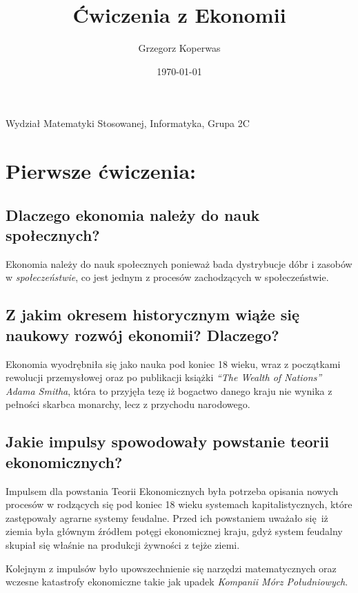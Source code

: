 \documentclass[a4paper,12pt]{article}
\title{Ćwiczenia z Ekonomii}
\author{Grzegorz Koperwas}
\date{\today}
\let\oldsection\section
\renewcommand\section{\clearpage\oldsection}
\begin{document}
\begin{titlepage}
	\maketitle
	\begin{center}
		Wydział Matematyki Stosowanej, Informatyka, Grupa 2C
	\end{center}
	\thispagestyle{empty}
\end{titlepage}
\setcounter{tocdepth}{1}
\tableofcontents
\pagebreak
\section{Pierwsze ćwiczenia:}


\subsection{Dlaczego ekonomia należy do nauk społecznych?}

Ekonomia należy do nauk społecznych ponieważ bada dystrybucje dóbr i zasobów w
\emph{społeczeństwie}, co jest jednym z procesów zachodzących w społeczeństwie.

\subsection{Z jakim okresem historycznym wiąże się naukowy rozwój ekonomii? Dlaczego?}

Ekonomia wyodrębniła się jako nauka pod koniec 18 wieku, wraz z początkami rewolucji
przemysłowej oraz po publikacji książki \emph{“The Wealth of Nations” Adama Smitha},
która to przyjęła tezę iż bogactwo danego kraju nie wynika z pełności skarbca monarchy,
lecz z przychodu narodowego.

\subsection{Jakie impulsy spowodowały powstanie teorii ekonomicznych?}

Impulsem dla powstania Teorii Ekonomicznych była potrzeba opisania nowych procesów w rodzących się pod koniec 18 wieku systemach kapitalistycznych, które zastępowały agrarne systemy feudalne. Przed ich powstaniem uważało się iż ziemia była głównym źródłem potęgi ekonomicznej kraju, gdyż system feudalny skupiał się właśnie na produkcji żywności z tejże ziemi.

Kolejnym z impulsów było upowszechnienie się narzędzi matematycznych oraz wczesne katastrofy ekonomiczne takie jak upadek \emph{Kompanii Mórz Południowych}.
\end{document}
